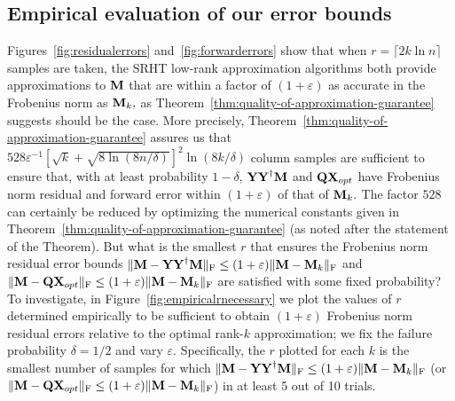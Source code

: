 \subsection{Empirical evaluation of our error bounds}
Figures~\ref{fig:residualerrors} and~\ref{fig:forwarderrors} show that when $r = \lceil 2 k \ln n \rceil$ samples are taken, the SRHT low-rank approximation algorithms both provide approximations to ${\bm{\mathrm{M}}}$ that are within a factor of $(1 + \varepsilon)$ as accurate in the Frobenius norm as ${\bm{\mathrm{M}}}_k,$ as Theorem~\ref{thm:quality-of-approximation-guarantee} suggests should be the case. More precisely, Theorem~\ref{thm:quality-of-approximation-guarantee} assures us that $528 \varepsilon^{-1} [\sqrt{k} + \sqrt{8 \ln(8 n/\delta)}]^2 \ln(8k/\delta)$ column samples are sufficient to ensure that, with at least probability $1 - \delta$, ${\bm{\mathrm{Y}}} {{\bm{\mathrm{Y}}}}^\dagger {\ensuremath{\bm{\mathrm{M}}}}$ and ${\bm{\mathrm{Q}}} {\bm{\mathrm{X}}}_{opt}$ have Frobenius norm residual and forward error within $(1 + \varepsilon)$ of that of ${\bm{\mathrm{M}}}_k.$ The factor $528$ can certainly be reduced by optimizing the numerical constants given in Theorem~\ref{thm:quality-of-approximation-guarantee} (as noted after the statement of the Theorem). But what is the smallest $r$ that ensures the
Frobenius norm residual error bounds $\mbox{}\|{\bm{\mathrm{M}}} - {\bm{\mathrm{Y}}}{\bm{\mathrm{Y}}}^\dagger {\ensuremath{\bm{\mathrm{M}}}}\|_\mathrm{F} \leq (1 + \varepsilon) \mbox{}\|{\bm{\mathrm{M}}} - {\bm{\mathrm{M}}}_k\|_\mathrm{F}$ and $\mbox{}\|{\bm{\mathrm{M}}} - {\bm{\mathrm{Q}}}{\bm{\mathrm{X}}}_{opt}\|_\mathrm{F} \leq (1 + \varepsilon) \mbox{}\|{\bm{\mathrm{M}}} - {\bm{\mathrm{M}}}_k\|_\mathrm{F}$ are satisfied with some fixed probability? To investigate, in Figure~\ref{fig:empiricalrnecessary} we plot the values of $r$ determined empirically to be sufficient to obtain $(1+\varepsilon)$ Frobenius norm residual errors relative to the optimal rank-$k$ approximation; we fix the failure probability $\delta=1/2$ and vary $\varepsilon.$ Specifically, the $r$ plotted for each $k$ is the smallest number of samples for which $\mbox{}\|{\bm{\mathrm{M}}} - {\bm{\mathrm{Y}}} {\bm{\mathrm{Y}}}^\dagger {\ensuremath{\bm{\mathrm{M}}}}\|_\mathrm{F} \leq (1 + \varepsilon) \mbox{}\|{\bm{\mathrm{M}}} - {\bm{\mathrm{M}}}_k\|_\mathrm{F}$ (or $\mbox{}\|{\bm{\mathrm{M}}} - {\bm{\mathrm{Q}}} {\bm{\mathrm{X}}}_{opt}\|_\mathrm{F} \leq (1 + \varepsilon) \mbox{}\|{\bm{\mathrm{M}}} - {\bm{\mathrm{M}}}_k\|_\mathrm{F}$) in at least 5 out of 10 trials.


